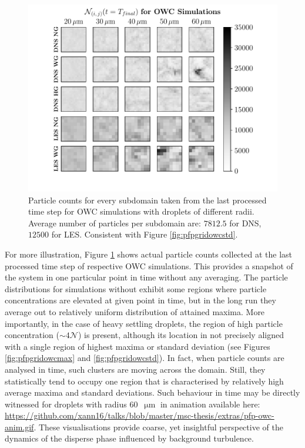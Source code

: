 \documentclass{pracamgren}
\begin{document}
\begin{figure}[!h]
\centering
\includegraphics[width=13.5cm]{img/plots/3-4h-pfpgridowclast.pdf}
\caption{
Particle counts for every subdomain taken from the last processed time step for OWC simulations with droplets of different radii.
Average number of particles per subdomain are: $7 812.5$ for DNS, $12 500$ for LES.
Consistent with Figure \ref{fig:pfpgridowcstd}.
}
\label{fig:pfpgridowclast}
\end{figure}

For more illustration, Figure \ref{fig:pfpgridowclast} shows actual particle counts collected at the last processed time step of respective OWC simulations.
This provides a snapshot of the system in one particular point in time without any averaging.  
The particle distributions for simulations without exhibit some regions where particle concentrations are elevated at given point in time, but in the long run they average out to relatively uniform distribution of attained maxima. 
More importantly, in the case of heavy settling droplets, the region of high particle concentration ($\sim 4 \mathcal{N}$) is present, although its location in not precisely aligned with a single region of highest maxima or standard deviation (see Figures \ref{fig:pfpgridowcmax} and \ref{fig:pfpgridowcstd}).
In fact, when particle counts are analysed in time, such clusters are moving across the domain.
Still, they statistically tend to occupy one region that is characterised by relatively high average maxima and standard deviations.
Such behaviour in time may be directly witnessed for droplets with radius $60$~$\upmu\text{m}$ in animation available here: \url{https://github.com/xann16/talks/blob/master/msc-thesis/extras/pfp-owc-anim.gif}.
These visualisations provide coarse, yet insightful perspective of the dynamics of the disperse phase influenced by background turbulence.
\end{document}
